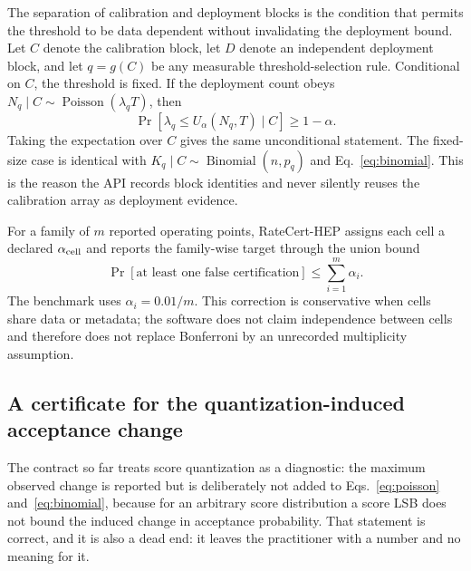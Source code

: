 \documentclass[preprint,12pt]{elsarticle}
\begin{document}
The separation of calibration and deployment blocks is the condition that
permits the threshold to be data dependent without invalidating the deployment
bound.  Let $C$ denote the calibration block, let $D$ denote an independent
deployment block, and let $q=g(C)$ be any measurable threshold-selection rule.
Conditional on $C$, the threshold is fixed.  If the deployment count obeys
$N_q\mid C\sim\operatorname{Poisson}(\lambda_qT)$, then
\begin{equation}
 \Pr\!\left[\lambda_q\le U_\alpha(N_q,T)\mid C\right]\ge 1-\alpha .
 \label{eq:conditional-poisson}
\end{equation}
Taking the expectation over $C$ gives the same unconditional statement.  The
fixed-size case is identical with $K_q\mid C\sim\operatorname{Binomial}(n,p_q)$
and Eq.~\eqref{eq:binomial}.  This is the reason the API records block
identities and never silently reuses the calibration array as deployment
evidence.

For a family of $m$ reported operating points, RateCert-HEP assigns each cell a
declared $\alpha_{\rm cell}$ and reports the family-wise target through the
union bound
\begin{equation}
 \Pr[\text{at least one false certification}]
 \le \sum_{i=1}^{m}\alpha_i .
 \label{eq:familywise}
\end{equation}
The benchmark uses $\alpha_i=0.01/m$.  This correction is conservative when
cells share data or metadata; the software does not claim independence between
cells and therefore does not replace Bonferroni by an unrecorded multiplicity
assumption.

\subsection{A certificate for the quantization-induced acceptance change}
\label{sec:quant}

The contract so far treats score quantization as a diagnostic: the maximum
observed change is reported but is deliberately not added to
Eqs.~\eqref{eq:poisson} and~\eqref{eq:binomial}, because for an arbitrary score
distribution a score LSB does not bound the induced change in acceptance
probability.  That statement is correct, and it is also a dead end: it leaves
the practitioner with a number and no meaning for it.
\end{document}
